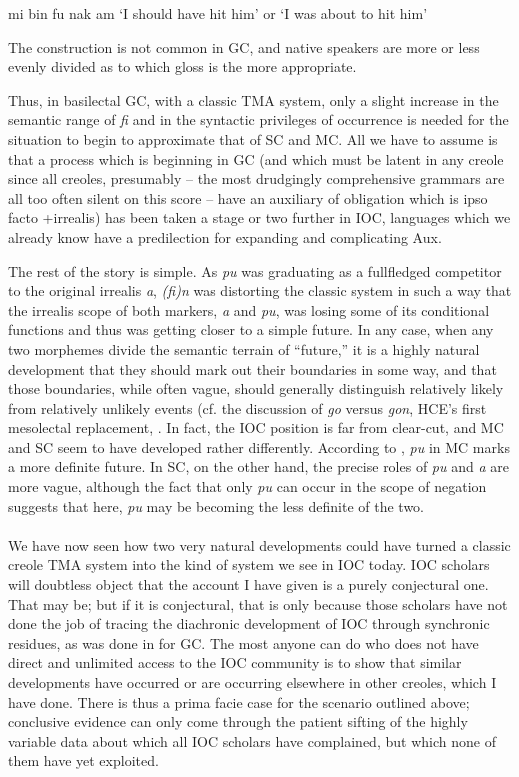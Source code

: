 \ea\label{ex:2:121}
mi bin fu nak am
\glt `I should have hit him' or `I was about to hit him'
\z

The construction is not common in GC, and native speakers are more or less evenly divided as to which gloss is the more appropriate.

Thus, in basilectal GC, with a classic TMA system, only a slight increase in the semantic range of \textit{fi} and in the syntactic privileges of occurrence is needed for the situation to begin to approximate that of SC and MC. All we have to assume is that a process which is beginning in GC (and which must be latent in any creole since all creoles, presumably -- the most drudgingly comprehensive grammars are all too often silent on this score -- have an auxiliary of obligation which is ipso facto +irrealis) has been taken a stage or two further in IOC, languages which we already know have a predilection for expanding and complicating Aux.

The rest of the story is simple. As \textit{pu} was graduating as a full\-fledged competitor to the original irrealis \textit{a}, \textit{(fi)n} was distorting the classic system in such a way that the irrealis scope of both markers, \textit{a} and \textit{pu}, was losing some of its conditional functions and thus was getting closer to a simple future. In any case, when any two mor\-phemes divide the semantic terrain of ``future,'' it is a highly natural development that they should mark out their boundaries in some way, and that those boundaries, while often vague, should generally dis\-tinguish relatively likely from relatively unlikely events (cf. the discus\-sion of \textit{go} versus \textit{gon}, HCE's first mesolectal replacement, \citet[23ff., 181ff.]{Bickerton1977}.
In fact, the IOC position is far from clear-cut, and MC and SC seem to have developed rather differently. According to \citet{Corne1977}, \textit{pu} in MC marks a more definite future. In SC, on the other hand, the precise roles of \textit{pu} and \textit{a} are more vague, although the fact that only \textit{pu} can occur in the scope of negation suggests that here, \textit{pu} may be becoming the less definite of the two.\\\\

We have now seen how two very natural developments could have turned a classic creole TMA system into the kind of system we see in IOC today. IOC scholars will doubtless object that the account I have given is a purely conjectural one. That may be; but if it is con\-jectural, that is only because those scholars have not done the job of tracing the diachronic development of IOC through synchronic resi\-dues, as was done in \citet{Bickerton1975} for GC. The most anyone can do who does not have direct and unlimited access to the IOC commun\-ity is to show that similar developments have occurred or are occurring elsewhere in other creoles, which I have done. There is thus a prima facie case for the scenario outlined above; conclusive evidence can only come through the patient sifting of the highly variable data about which all IOC scholars have complained, but which none of them have yet exploited.\\\\

